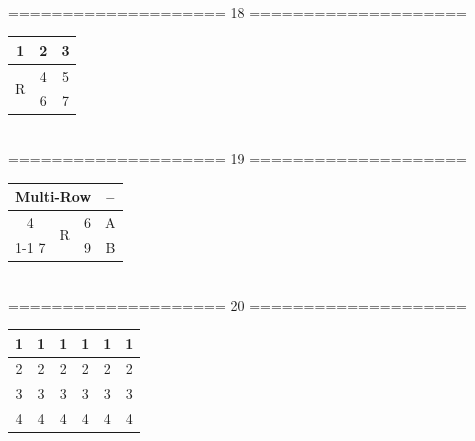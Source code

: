 \documentclass[12pt, a4paper, onecolumn]{article}
\begin{document}
\begin{center}
\begin{tabular}{|c|c|c|c|}
\end{tabular}\\[20pt]



====================  18  ====================\\[15pt] %
%

\begin{tabular}{|c|c|c|}
	
	\hline
	1 & 2 & 3\\
	\hline
	\multirow{2}{0.3cm}{R} & 4 & 5\\
	\cline{2-3}
	 & 6 & 7\\
	\hline
	
\end{tabular}\\[20pt]




====================  19  ====================\\[15pt] %
%

\begin{tabular}{|c|c|c|c|}
	
	\hline
	\multicolumn{3}{|c|}{Multi-Row} & --\\
	\hline
	4 & \multirow{2}{0.3cm}{R} & 6 & A\\
	\cline{1-1} \cline{3-4}
	7 &  & 9 & B\\
	\hline
	
\end{tabular}\\[20pt]


====================  20  ====================\\[15pt]
%

{ %
	\begin{tabular}{|c|c|c|c|c|c|}
		\hline
		1 & 1 & 1 & 1 & 1 & 1\\
		\hline
		2 & 2 & 2 & 2 & 2 & 2\\
		\hline
		3 & 3 & 3 & 3 & 3 & 3\\
		\hline
		4 & 4 & 4 & 4 & 4 & 4\\
		\hline
	\end{tabular}
}\\[20pt] %




\end{center}
\end{document}
